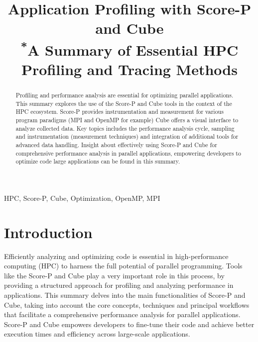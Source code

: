 \documentclass[conference]{IEEEtran}
\begin{document}
\title{Application Profiling with Score-P and Cube\\
{\footnotesize \textsuperscript{*}A Summary of Essential HPC Profiling and Tracing Methods}
}
\author{



}

\maketitle

\begin{abstract}
Profiling and performance analysis are essential for optimizing parallel applications.
This summary explores the use of the Score-P and Cube tools in the context of the HPC ecosystem.
Score-P provides instrumentation and measurement for various program paradigms (MPI and OpenMP for example)
Cube offers a visual interface to analyze collected data.
Key topics includes the performance analysis cycle, sampling and instrumentation (measurement techniques) and integration of additional tools for advanced data handling.
Insight about effectively using Score-P and Cube for comprehensive performance analysis in parallel applications, empowering developers to optimize code large applications can be found in this summary.
\end{abstract}

\begin{IEEEkeywords}
HPC, Score-P, Cube, Optimization, OpenMP, MPI
\end{IEEEkeywords}

\section{Introduction}
Efficiently analyzing  and optimizing code is essential in high-performance computing (HPC) to harness the full potential of parallel programming. 
Tools like the Score-P and Cube play a very important role in this process, by providing a structured approach for profiling and analyzing performance in applications.
This summary delves into the main functionalities of Score-P and Cube, taking into account the core concepts, techniques and principal workflows that facilitate a comprehensive performance analysis for parallel applications.
Score-P and Cube empowers developers to fine-tune their code and achieve better execution times and efficiency across large-scale applications.
\end{document}

